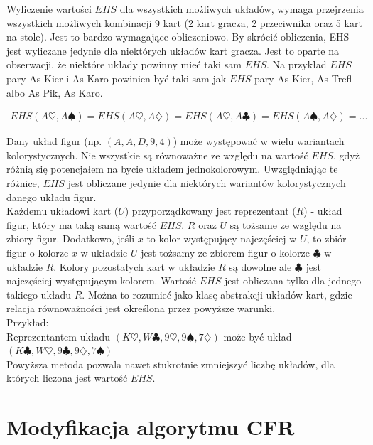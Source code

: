 \documentclass[licencjacka]{pracamgr}
\begin{document}
\noindent
Wyliczenie wartości $EHS$ dla wszystkich możliwych układów, wymaga przejrzenia wszystkich możliwych kombinacji 9 kart (2 kart gracza, 2 przeciwnika
oraz 5 kart na stole). Jest to bardzo wymagające obliczeniowo. By skrócić obliczenia, EHS jest wyliczane jedynie dla niektórych układów
kart gracza. Jest to oparte na obserwacji, że niektóre układy powinny mieć taki sam $EHS$. Na przykład $EHS$ pary As Kier i As Karo powinien być taki
sam jak $EHS$ pary As Kier, As Trefl albo As Pik, As Karo. 

\begin{align*}
EHS(A\heartsuit, A\spadesuit) = EHS(A\heartsuit, A\diamondsuit) = EHS(A\heartsuit, A\clubsuit) = EHS(A\spadesuit, A\diamondsuit) = ...
\end{align*}

\noindent
Dany układ figur (np. $(A,A,D,9,4)$) może występować w wielu wariantach kolorystycznych. Nie wszystkie są równoważne ze względu
na wartość $EHS$, gdyż różnią się potencjałem na bycie układem jednokolorowym. Uwzględniając te różnice, $EHS$ jest obliczane jedynie
dla niektórych wariantów kolorystycznych danego układu figur. \\

\noindent
Każdemu układowi kart ($U$) przyporządkowany jest reprezentant ($R$) - układ figur, który ma taką samą wartość $EHS$.
$R$ oraz $U$ są tożsame ze względu na zbiory figur. Dodatkowo, jeśli $x$ to kolor występujący najczęściej w $U$,
to zbiór figur o kolorze $x$ w układzie $U$ jest tożsamy ze zbiorem figur o kolorze $\clubsuit$ w układzie $R$.
Kolory pozostałych kart w układzie $R$ są dowolne ale $\clubsuit$ jest najczęściej występującym kolorem. Wartość
$EHS$ jest obliczana tylko dla jednego takiego układu $R$. Można to rozumieć jako klasę abstrakcji układów kart, gdzie
relacja równoważności jest określona przez powyższe warunki. \\

\noindent
Przykład: \\

\noindent
Reprezentantem układu $(K\heartsuit, W\clubsuit, 9\heartsuit, 9\spadesuit, 7\diamondsuit)$ może być układ
$(K\clubsuit, W\heartsuit, 9\clubsuit, 9\diamondsuit, 7\spadesuit)$ \\

\noindent
Powyższa metoda pozwala nawet stukrotnie zmniejszyć liczbę układów, dla których liczona jest wartość $EHS$.

\section{Modyfikacja algorytmu CFR}
\end{document}
